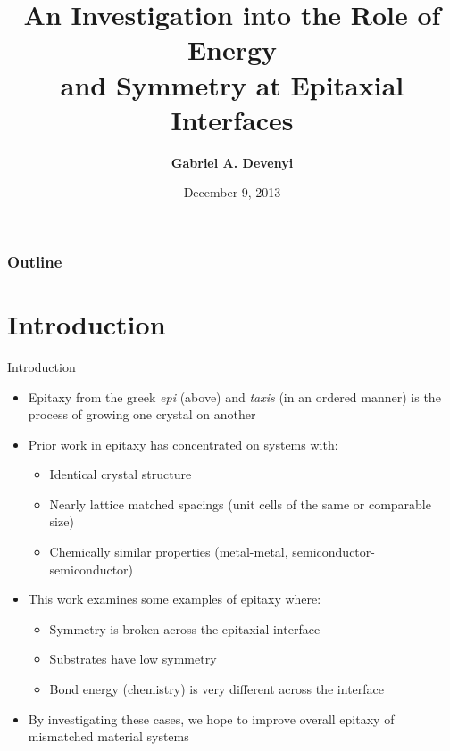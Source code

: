 \documentclass[]{beamer}%
\title[Energy and Symmetry in Epitaxy]{An Investigation into the Role of Energy\\ and Symmetry at Epitaxial Interfaces}
\author[Gabriel A. Devenyi]{\textbf{Gabriel A. Devenyi}}
\institute[McMaster University]{
    Department of Engineering Physics\\McMaster University
}
\date{December 9, 2013}
\begin{document}


\begin{frame}
\frametitle{Outline}
\tableofcontents
\end{frame}

\section{Introduction}
\begin{frame}
    \begin{block}{Introduction}
        \begin{itemize}[<+-| alert@+>]
            \item Epitaxy from the greek \textit{epi} (above) and \textit{taxis} (in an ordered manner) is the process of growing one crystal on another
            \item Prior work in epitaxy has concentrated on systems with:
            \begin{itemize}[<+-| alert@+>]
                \item Identical crystal structure
                \item Nearly lattice matched spacings (unit cells of the same or comparable size)
                \item Chemically similar properties (metal-metal, semiconductor-semiconductor)
            \end{itemize}
            \item This work examines some examples of epitaxy where:
            \begin{itemize}
                \item Symmetry is broken across the epitaxial interface
                \item Substrates have low symmetry
                \item Bond energy (chemistry) is very different across the interface
            \end{itemize}
            \item By investigating these cases, we hope to improve overall epitaxy of mismatched material systems
        \end{itemize}
    \end{block}
\end{frame}
\end{document}

